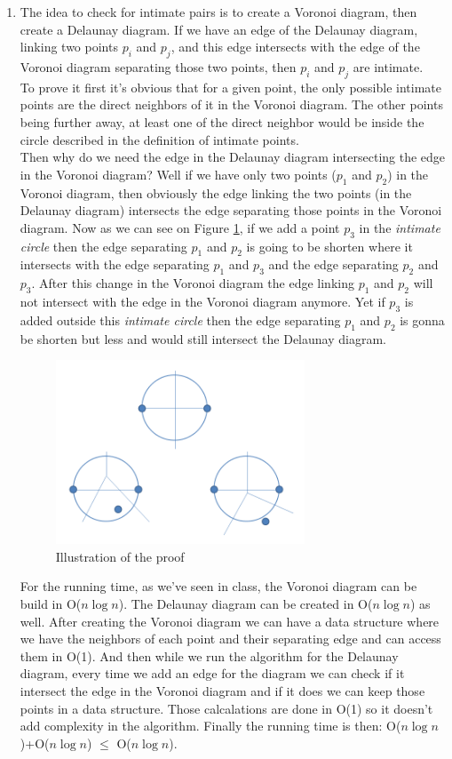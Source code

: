 \begin{enumerate}
	\item The idea to check for intimate pairs is to create a Voronoi diagram, then create a Delaunay diagram. If we have an edge of the Delaunay diagram, linking two points $p_i$ and $p_j$, and this edge intersects with the edge of the Voronoi diagram separating those two points, then $p_i$ and $p_j$ are intimate.\\
To prove it first it's obvious that for a given point, the only possible intimate points are the direct neighbors of it in the Voronoi diagram. The other points being further away, at least one of the direct neighbor would be inside the circle described in the definition of intimate points.\\
Then why do we need the edge in the Delaunay diagram intersecting the edge in the Voronoi diagram? Well if we have only two points ($p_1$ and $p_2$) in the Voronoi diagram, then obviously the edge linking the two points (in the Delaunay diagram) intersects the edge separating those points in the Voronoi diagram. Now as we can see on Figure \ref{fig:q11}, if we add a point $p_3$ in the \textit{intimate circle} then the edge separating $p_1$ and $p_2$ is going to be shorten where it intersects with the edge separating $p_1$ and $p_3$ and the edge separating $p_2$ and $p_3$. After this change in the Voronoi diagram the edge linking $p_1$ and $p_2$ will not intersect with the edge in the Voronoi diagram anymore. Yet if $p_3$ is added outside this \textit{intimate circle} then the edge separating $p_1$ and $p_2$ is gonna be shorten but less and would still intersect the Delaunay diagram.
\begin{figure}[ht]
  \centering
\includegraphics[width=0.7\textwidth]{q11}%
\caption{Illustration of the proof}%
\label{fig:q11}%
\end{figure}
\clearpage
For the running time, as we've seen in class, the Voronoi diagram can be build in O($n\log n$). The Delaunay diagram can be created in O($n\log n$) as well. After creating the Voronoi diagram we can have a data structure where we have the neighbors of each point and their separating edge and can access them in O(1). And then while we run the algorithm for the Delaunay diagram, every time we add an edge for the diagram we can check if it intersect the edge in the Voronoi diagram and if it does we can keep those points in a data structure. Those calcalations are done in O(1) so it doesn't add complexity in the algorithm. Finally the running time is then: O($n\log n$)+O($n \log n$) $\leq$ O($n \log n$).\\

\end{enumerate}
